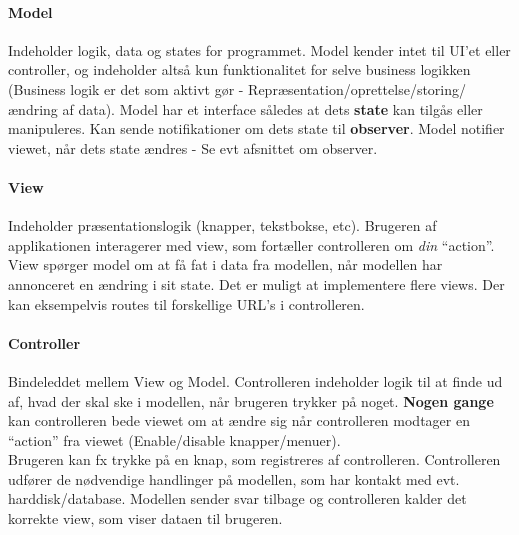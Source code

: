 \paragraph{Model} Indeholder logik, data og states for programmet. Model kender intet til UI’et eller controller, og indeholder altså kun funktionalitet for selve business logikken (Business logik er det som aktivt gør - Repræsentation/oprettelse/storing/ændring af data). Model har et interface således at dets \textbf{state} kan tilgås eller manipuleres. Kan sende notifikationer om dets state til \textbf{observer}. Model notifier viewet, når dets state ændres - Se evt afsnittet om observer.

\paragraph{View} Indeholder præsentationslogik (knapper, tekstbokse, etc). Brugeren af applikationen interagerer med view, som fortæller controlleren om \textit{din} “action”. View spørger model om at få fat i data fra modellen, når modellen har annonceret en ændring i sit state. Det er muligt at implementere flere views. Der kan eksempelvis routes til forskellige URL's i controlleren.

\paragraph{Controller} Bindeleddet mellem View og Model. Controlleren indeholder logik til at finde ud af, hvad der skal ske i modellen, når brugeren trykker på noget. \textbf{Nogen gange} kan controlleren bede viewet om at ændre sig når controlleren modtager en “action” fra viewet (Enable/disable knapper/menuer).\\	

Brugeren kan fx trykke på en knap, som registreres af controlleren. Controlleren udfører de nødvendige handlinger på modellen, som har kontakt med evt. harddisk/database. Modellen sender svar tilbage og controlleren kalder det korrekte view, som viser dataen til brugeren.

